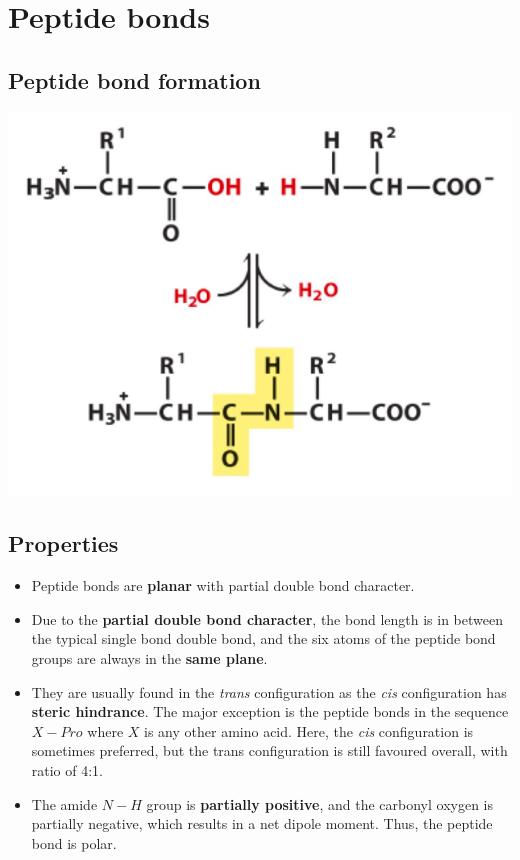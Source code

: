 \documentclass[11pt]{article}
\begin{document}
\section{Peptide bonds}
\label{sec:org9caa9bc}

\subsection{Peptide bond formation}
\label{sec:org1fce53e}
\begin{center}
\includegraphics[width=.9\linewidth]{./images/peptide-bond-formation.png}
\end{center}
\subsection{Properties}
\label{sec:org99c7c22}
\begin{itemize}
\item Peptide bonds are \textbf{planar} with partial double bond character.
\item Due to the \textbf{partial double bond character}, the bond length is in between the typical single bond double bond, and the six atoms of the peptide bond groups are always in the \textbf{same plane}.
\item They are usually found in the \emph{trans} configuration as the \emph{cis} configuration has \textbf{steric hindrance}. The major exception is the peptide bonds in the sequence \(X-Pro\) where \(X\) is any other amino acid. Here, the \emph{cis} configuration is sometimes preferred, but the trans configuration is still favoured overall, with ratio of 4:1.
\item The amide \(N-H\) group is \textbf{partially positive}, and the carbonyl oxygen is partially negative, which results in a net dipole moment. Thus, the peptide bond is polar.
\end{itemize}
\end{document}
